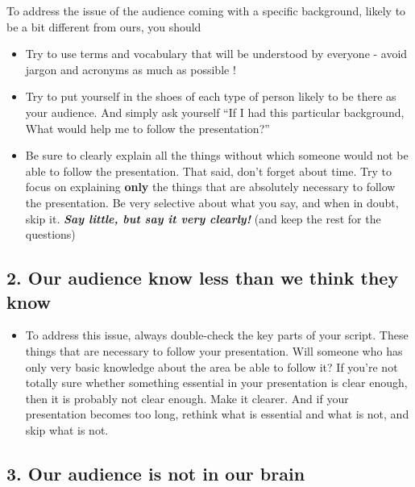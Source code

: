 \documentclass[
]{book}
\providecommand{\tightlist}{%
  \setlength{\itemsep}{0pt}\setlength{\parskip}{0pt}}
\begin{document}
To address the issue of the audience coming with a specific background, likely to be a bit different from ours, you should

\begin{itemize}
\tightlist
\item
  Try to use terms and vocabulary that will be understood by everyone - avoid jargon and acronyms as much as possible !\\
\item
  Try to put yourself in the shoes of each type of person likely to be there as your audience. And simply ask yourself ``If I had this particular background, What would help me to follow the presentation?''\\
\item
  Be sure to clearly explain all the things without which someone would not be able to follow the presentation. That said, don't forget about time. Try to focus on explaining \textbf{only} the things that are absolutely necessary to follow the presentation. Be very selective about what you say, and when in doubt, skip it.
  \textbf{\emph{Say little, but say it very clearly!}} (and keep the rest for the questions)
\end{itemize}

\hypertarget{our-audience-know-less-than-we-think-they-know}{%
\subsection{2. Our audience know less than we think they know}\label{our-audience-know-less-than-we-think-they-know}}

\begin{itemize}
\tightlist
\item
  To address this issue, always double-check the key parts of your script. These things that are necessary to follow your presentation. Will someone who has only very basic knowledge about the area be able to follow it? If you're not totally sure whether something essential in your presentation is clear enough, then it is probably not clear enough. Make it clearer. And if your presentation becomes too long, rethink what is essential and what is not, and skip what is not.
\end{itemize}

\hypertarget{our-audience-is-not-in-our-brain}{%
\subsection{3. Our audience is not in our brain}\label{our-audience-is-not-in-our-brain}}
\end{document}
